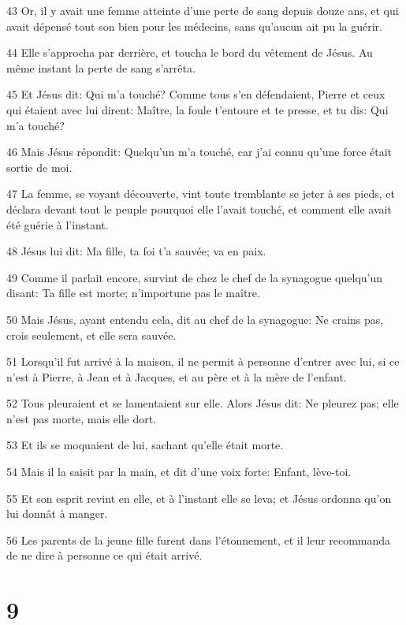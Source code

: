 \par 43 Or, il y avait une femme atteinte d'une perte de sang depuis douze ans, et qui avait dépensé tout son bien pour les médecins, sans qu'aucun ait pu la guérir.
\par 44 Elle s'approcha par derrière, et toucha le bord du vêtement de Jésus. Au même instant la perte de sang s'arrêta.
\par 45 Et Jésus dit: Qui m'a touché? Comme tous s'en défendaient, Pierre et ceux qui étaient avec lui dirent: Maître, la foule t'entoure et te presse, et tu dis: Qui m'a touché?
\par 46 Mais Jésus répondit: Quelqu'un m'a touché, car j'ai connu qu'une force était sortie de moi.
\par 47 La femme, se voyant découverte, vint toute tremblante se jeter à ses pieds, et déclara devant tout le peuple pourquoi elle l'avait touché, et comment elle avait été guérie à l'instant.
\par 48 Jésus lui dit: Ma fille, ta foi t'a sauvée; va en paix.
\par 49 Comme il parlait encore, survint de chez le chef de la synagogue quelqu'un disant: Ta fille est morte; n'importune pas le maître.
\par 50 Mais Jésus, ayant entendu cela, dit au chef de la synagogue: Ne crains pas, crois seulement, et elle sera sauvée.
\par 51 Lorsqu'il fut arrivé à la maison, il ne permit à personne d'entrer avec lui, si ce n'est à Pierre, à Jean et à Jacques, et au père et à la mère de l'enfant.
\par 52 Tous pleuraient et se lamentaient sur elle. Alors Jésus dit: Ne pleurez pas; elle n'est pas morte, mais elle dort.
\par 53 Et ils se moquaient de lui, sachant qu'elle était morte.
\par 54 Mais il la saisit par la main, et dit d'une voix forte: Enfant, lève-toi.
\par 55 Et son esprit revint en elle, et à l'instant elle se leva; et Jésus ordonna qu'on lui donnât à manger.
\par 56 Les parents de la jeune fille furent dans l'étonnement, et il leur recommanda de ne dire à personne ce qui était arrivé.

\chapter{9}

